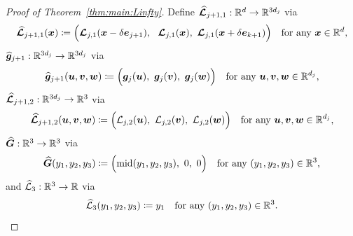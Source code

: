 \documentclass[nohyperref]{article}
\theoremstyle{plain}
\theoremstyle{definition}
\theoremstyle{remark}
\begin{document}
\begin{proof}[Proof of Theorem~\ref{thm:main:Linfty}]
		 
	Define $\bmhatcalL_{j+1,1}:\R^{d}\to\R^{3d_j}$ via 
	\begin{equation*}
		\bmhatcalL_{j+1,1}(\bmx)
		\coloneqq \Big( \bmcalL_{j,1}(\bmx-\delta  \bme_{j+1}), \
		\ \bmcalL_{j,1}(\bmx), \   \bmcalL_{j,1}(\bmx+\delta  \bme_{k+1})\Big)\quad \tn{for any $\bmx\in\R^d$,}
	\end{equation*}
$\bmhatg_{j+1}:\R^{3d_j}\to\R^{3d_j}$ via
\begin{equation*}
	\bmhatg_{j+1}(\bmu,\bmv,\bmw)\coloneqq \Big(\bmg_j(\bmu),\   \bmg_j(\bmv),\  \bmg_j(\bmw)\Big)\quad \tn{for any $\bmu,\bmv,\bmw\in \R^{d_j}$,}
\end{equation*}
$\bmhatcalL_{j+1,2}:\R^{3d_j}\to\R^3$ via
\begin{equation*}
		\bmhatcalL_{j+1,2}(\bmu,\bmv,\bmw)
	\coloneqq \Big( \calL_{j,2}(\bmu), 
	\ \calL_{j,2}(\bmv), \   \calL_{j,2}(\bmw)\Big)\quad \tn{for any $\bmu,\bmv,\bmw\in\R^{d_j}$,}
\end{equation*}
$\bmhatG:\R^3\to\R^3$ via
\begin{equation*}
	\bmhatG(y_1,y_2,y_3)\coloneqq \Big(\middleValue(y_1,y_2,y_3), \ 0, \ 0\Big)\quad \tn{for any $(y_1,y_2,y_3)\in \R^3$,}
\end{equation*}
and $\hatcalL_3:\R^3\to\R$ via
\begin{equation*}
	\hatcalL_3(y_1,y_2,y_3)\coloneqq y_1\quad \tn{for any $(y_1,y_2,y_3)\in\R^3$.}
\end{equation*}


\end{proof}
\end{document}
